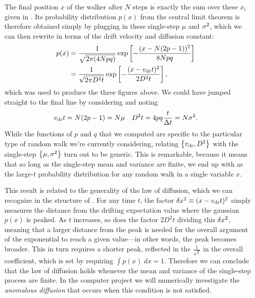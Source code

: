 The final position $x$ of the walker after $N$ steps is exactly the sum over these $x_i$ given in .
Its probability distribution $p(x)$ from the central limit theorem is therefore obtained simply by plugging in these single-step $\mu$ and $\sigma^2$, which we can then rewrite in terms of the drift velocity and diffusion constant:
\begin{align}
  p(x) & = \frac{1}{\sqrt{2\pi (4Npq)}} \exp\left[-\frac{(x - N(2p - 1))^2}{8Npq}\right] \cr
       & = \frac{1}{\sqrt{2\pi D^2 t}} \exp\left[-\frac{(x - v_{\mathrm{dr}} t)^2}{2D^2 t}\right], \label{eq:RW_CLT}
\end{align}
which was used to produce the three figures above.
We could have jumped straight to the final line by considering  and noting
\begin{align}
  \label{eq:single_step}
  v_{\mathrm{dr}} t & = N(2p - 1) = N \mu &
  D^2 t & = 4pq \frac{t}{\Delta t} = N \sigma^2.
\end{align}
While the functions of $p$ and $q$ that we computed are specific to the particular type of random walk we're currently considering,  relating $\left\{v_{\mathrm{dr}}, D^2\right\}$ with the single-step $\left\{\mu, \sigma^2\right\}$ turn out to be generic.
This is remarkable, because it means that so long as the single-step mean and variance are finite, we end up with  as the large-$t$ probability distribution for any random walk in a single variable $x$.

This result is related to the generality of the law of diffusion, which we can recognize in the structure of .
For any time $t$, the factor $\delta x^2 \equiv (x - v_{\mathrm{dr}} t)^2$ simply measures the distance from the drifting expectation value where the gaussian $p(x)$ is peaked.
As $t$ increases, so does the factor $2D^2 t$ dividing this $\delta x^2$, meaning that a larger distance from the peak is needed for the overall argument of the exponential to reach a given value---in other words, the peak becomes broader.
This in turn requires a shorter peak, reflected in the $\frac{1}{\sqrt{t}}$ in the overall coefficient, which is set by requiring $\int p(x) \; dx = 1$.
Therefore we can conclude that the law of diffusion holds whenever the mean and variance of the single-step process are finite.
In the computer project we will numerically investigate the \textit{anomalous diffusion} that occurs when this condition is not satisfied.
